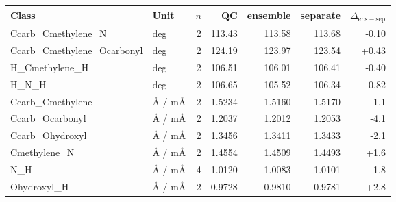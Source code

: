 \begin{tabular}{llrrrrr}
\toprule
Class & Unit & $n$ & QC & ensemble & separate & $\Delta_\mathrm{ens-sep}$ \\
\midrule
Ccarb\_Cmethylene\_N & deg & 2 & 113.43 & 113.58 & 113.68 & -0.10 \\
Ccarb\_Cmethylene\_Ocarbonyl & deg & 2 & 124.19 & 123.97 & 123.54 & +0.43 \\
H\_Cmethylene\_H & deg & 2 & 106.51 & 106.01 & 106.41 & -0.40 \\
H\_N\_H & deg & 2 & 106.65 & 105.52 & 106.34 & -0.82 \\
Ccarb\_Cmethylene & \AA{} / m\AA & 2 & 1.5234 & 1.5160 & 1.5170 & -1.1 \\
Ccarb\_Ocarbonyl & \AA{} / m\AA & 2 & 1.2037 & 1.2012 & 1.2053 & -4.1 \\
Ccarb\_Ohydroxyl & \AA{} / m\AA & 2 & 1.3456 & 1.3411 & 1.3433 & -2.1 \\
Cmethylene\_N & \AA{} / m\AA & 2 & 1.4554 & 1.4509 & 1.4493 & +1.6 \\
N\_H & \AA{} / m\AA & 4 & 1.0120 & 1.0083 & 1.0101 & -1.8 \\
Ohydroxyl\_H & \AA{} / m\AA & 2 & 0.9728 & 0.9810 & 0.9781 & +2.8 \\
\bottomrule
\end{tabular}
